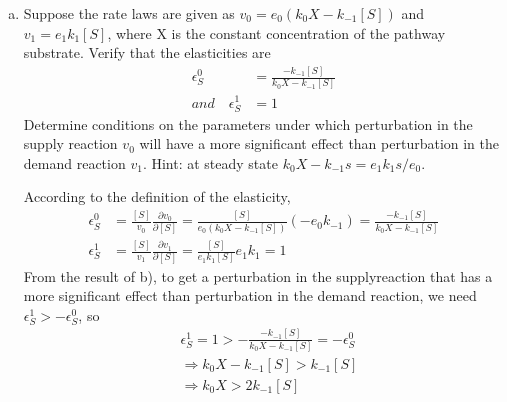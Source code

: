 \documentclass[paper=a4, fontsize=11pt]{scrartcl} %
\numberwithin{equation}{section} %
\numberwithin{figure}{section} %
\numberwithin{table}{section} %
\begin{document}
\begin{enumerate}[a)]
		\item Suppose the rate laws are given as $v_0 = e_0(k_0X - k_{-1}[S])$ and $v_1 = e_1k_1[S]$, where X is the constant concentration of the pathway substrate. Verify that the elasticities are
		\begin{align*}
			\epsilon_S^0 &= \frac{-k_{-1}[S]}{k_0X-k_{-1}[S]}\\
			and \quad \epsilon_S^1 &= 1
		\end{align*}
		Determine conditions on the parameters under which perturbation in the supply reaction $v_0$ will have a more significant effect than perturbation in the demand reaction $v_1$. Hint: at steady state $k_0X-k_{-1}s = e_1k_1s/e_0$.

		According to the definition of the elasticity,
		\begin{align*}
			\epsilon_S^0 &= \frac{[S]}{v_0}\frac{\partial v_0}{\partial[S]}=\frac{[S]}{e_0(k_0X - k_{-1}[S])}(-e_0k_{-1})=\frac{-k_{-1}[S]}{k_0X - k_{-1}[S]} \\
			\epsilon_S^1 &= \frac{[S]}{v_1}\frac{\partial v_1}{\partial[S]}=\frac{[S]}{e_1k_1[S]}e_1k_1=1
		\end{align*}
		From the result of b), to get a perturbation in the supplyreaction that has a more significant effect than perturbation in the demand reaction, we need $\epsilon_S^1 >-\epsilon_S^0$, so
		\begin{align*}
			& \epsilon_S^1 = 1 > -\frac{-k_{-1}[S]}{k_0X-k_{-1}[S]} = -\epsilon_S^0\\
			& \Rightarrow k_0X-k_{-1}[S] > k_{-1}[S] \\
			& \Rightarrow k_0X > 2k_{-1}[S] 
		\end{align*}
	\end{enumerate}
\end{document}
